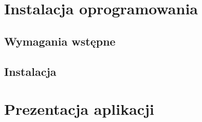 \section{Instalacja oprogramowania}\label{sec:software-installation}
\subsection{Wymagania wstępne}\label{subsec:prerequirements}

\lipsum[5]

\subsection{Instalacja}\label{subsec:installation}

\lipsum[5]

\section{Prezentacja aplikacji}\label{sec:app-presentation}

\lipsum[5]

\thispagestyle{normal}
